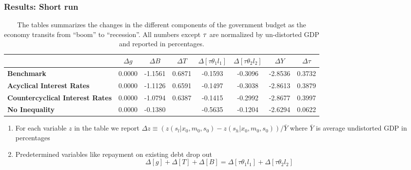 \documentclass{beamer}
\begin{document}
 \begin{frame}
 \frametitle{Results: Short run}
 {\tiny
\begin{table}[tbp]
\begin{tabular}{|l|c|c|c|c|c|c|c|}
\hline
& \textbf{$\Delta g$} & \textbf{$\Delta B$} & \textbf{$\Delta T$} & \textbf{$%
\Delta [\tau\theta_1l_1]$} & \textbf{$\Delta [\tau\theta_2l_2]$} & \textbf{$%
\Delta Y$} & \textbf{$\Delta \tau$} \\ \hline
\textbf{Benchmark} & 0.0000 & -1.1561 & 0.6871 & -0.1593 & -0.3096 & -2.8536
& 0.3732 \\ \hline
\textbf{Acyclical Interest Rates} & 0.0000 & -1.1126 & 0.6591 & -0.1497 &
-0.3038 & -2.8613 & 0.3879 \\ \hline
\textbf{Countercyclical Interest Rates} & 0.0000 & -1.0794 & 0.6387 & -0.1415 &
-0.2992 & -2.8677 & 0.3997 \\ \hline
\textbf{No Inequality} & 0.0000 & -0.1380 &\color{red}{\textbf{ -0.5459}} & -0.5635 & -0.1204 &
-2.6294 & 0.0622 \\ \hline

\end{tabular}%

\caption{The tables summarizes the changes in the different components of the government budget as the economy transits from ``boom'' to  ``recession''.  All numbers except $\protect\tau $ are normalized by un-distorted GDP  and reported in percentages.
}

\label{tab:ShortRunPolicyResponses}
\end{table}
}
\begin{enumerate}
 \item For each variable
$z$ in the table we report  $\Delta z\equiv \left( z\left(
s_l|x_0,m_0,s_0\right) -z\left( s_h|x_0,m_0,s_0\right) \right) /\bar{Y}
$ where $\bar{Y}$ is average undistorted GDP in percentages
\item Predetermined variables like repayment on existing debt drop out
\begin{equation*}
\Delta [g]+\Delta[T]+ \Delta [B]=\Delta[\tau \theta_1 l_1]+ \Delta[\tau
\theta_2 l_2]
\end{equation*}%

\end{enumerate}

\small

 \end{frame}
\end{document}
